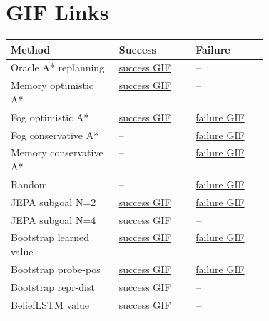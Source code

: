 \documentclass[10pt]{article}
\begin{document}
\section*{GIF Links}
\begin{longtable}{p{0.42\linewidth}ll}
\toprule
Method & Success & Failure \\
\midrule
Oracle A* replanning & \href{run:gifs/oracle_replan/positive.gif}{success GIF} & -- \\
Memory optimistic A* & \href{run:gifs/memory_optimistic/positive.gif}{success GIF} & -- \\
Fog optimistic A* & \href{run:gifs/fog_optimistic/positive.gif}{success GIF} & \href{run:gifs/fog_optimistic/negative.gif}{failure GIF} \\
Fog conservative A* & -- & \href{run:gifs/fog_conservative/negative.gif}{failure GIF} \\
Memory conservative A* & -- & \href{run:gifs/memory_conservative/negative.gif}{failure GIF} \\
Random & -- & \href{run:gifs/random/negative.gif}{failure GIF} \\
JEPA subgoal N=2 & \href{run:gifs/jepa_subgoal_n2/positive.gif}{success GIF} & \href{run:gifs/jepa_subgoal_n2/negative.gif}{failure GIF} \\
JEPA subgoal N=4 & \href{run:gifs/jepa_subgoal_n4/positive.gif}{success GIF} & -- \\
Bootstrap learned value & \href{run:gifs/learned_value/positive.gif}{success GIF} & \href{run:gifs/learned_value/negative.gif}{failure GIF} \\
Bootstrap probe-pos & \href{run:gifs/probe_pos/positive.gif}{success GIF} & \href{run:gifs/probe_pos/negative.gif}{failure GIF} \\
Bootstrap repr-dist & \href{run:gifs/repr_dist/positive.gif}{success GIF} & -- \\
BeliefLSTM value & \href{run:gifs/belief_value/positive.gif}{success GIF} & -- \\
\bottomrule
\end{longtable}
\end{document}

